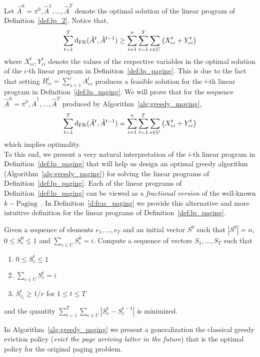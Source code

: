  \noindent Let $\hat{A}^0 = \pi^0,\hat{A}^1,\ldots, \hat{A}^T$ denote the optimal solution of the linear program of Definition~\ref{def:lp_2}. Notice that,
$$\sum_{t=1}^T \mathrm{d}_{\mathrm{FR}}(\hat{A}^t,\hat{A}^{t-1}) \geq  
\sum_{i=1}^n\sum_{t=1}^T\sum_{e \in U} \left(X_{ei}^t + Y_{ei}^t\right)
$$
where $X_{ei}^t,Y_{ei}^t$ denote the values of the respective variables in the optimal solution of the $i$-th linear program in Definition~\ref{def:lp_paging}. This is due to the fact that setting $B_{ei}^t = \sum_{s=1}^i A_{es}^t$ produces a feasible solution for the $i$-th linear program in Definition~\ref{def:lp_paging}. We will prove that for the sequence $\hat{A}^0 = \pi^0,\hat{A}^1,\ldots, \hat{A}^T$ produced by Algorithm~\ref{alg:greedy_moving},
$$\sum_{t=1}^T \mathrm{d}_{\mathrm{FR}}(\hat{A}^t,\hat{A}^{t-1}) =
\sum_{i=1}^n\sum_{t=1}^T\sum_{e \in U} \left(X_{ei}^t + Y_{ei}^t\right)
$$
which implies optimality.\\
\noindent To this end, we present a very natural interpretation of the $i$-th linear program in Definition~\ref{def:lp_paging} that will help us design an optimal greedy algorithm (Algorithm~\ref{alg:greedy_paging}) for solving the linear programs of Definition~\ref{def:lp_paging}.  Each of the linear programs of Definition~\ref{def:lp_paging} can be viewed as a \textit{fractional version} of the well-known $k-\mathrm{Paging}$~\cite{}. In Definition~\ref{d:frac_paging} we provide this alternative and more intuitive definition for the linear programs of Definition~\ref{def:lp_paging}. 
\begin{definition}\label{d:frac_paging}
Given a sequence of elements $e_1,\ldots,e_T$ and an initial vector $S^0$ such that $|S^0| = n$, $0 \leq S_e^0 \leq 1$ and
$\sum_{e \in U}S_e^0 = i$. Compute a sequence of vectors $S_1,\ldots,S_T$ such that

\begin{enumerate}
    \item $0 \leq S_e^t \leq 1$
    
    \item $\sum_{e \in U} S_e^t = i$
    
    \item $S_{e_t}^t \geq 1/r$ for $1\leq t \leq T$
\end{enumerate}
and the quantity $\sum_{t=1}^T \sum_{e \in U} | S_e^t - S_e^{t-1}|$ is minimized.
\end{definition}

\noindent In Algorithm~\ref{alg:greedy_paging} we present a generalization the classical greedy eviction policy (\textit{evict the page arriving latter in the future}) that is  the optimal policy for the original paging problem.

